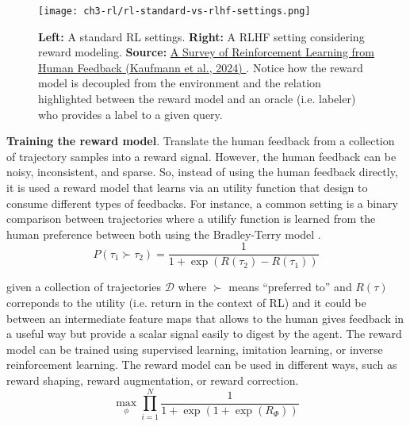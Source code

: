 \begin{figure}[ht]
    \centering
    \texttt{[image: ch3-rl/rl-standard-vs-rlhf-settings.png]}
    \captionsetup{width=\textwidth} %
    \caption{\textbf{Left:} A standard RL settings. \textbf{Right:} A RLHF setting considering reward modeling. \textbf{Source:} \href{https://arxiv.org/abs/2312.14925}{A Survey of Reinforcement Learning from Human Feedback (Kaufmann et al., 2024) \cite{kaufmann2023survey}}. Notice how the reward model is decoupled from the environment and the relation highlighted between the reward model and an oracle (i.e. labeler) who provides a label to a given query.}
    \label{fig:rlhf-setting}
  \end{figure}

\noindent \textbf{Training the reward model}. Translate the human feedback 
from a collection of trajectory samples into a reward signal. However,
the human feedback can be noisy, inconsistent, and sparse. So, instead of
using the human feedback directly, it is used a reward model that learns
via an utility function that design to consume different types of feedbacks. For instance, a common setting is a binary comparison between trajectories where a utilify function is learned from the human preference between both using the Bradley-Terry model \cite{bradley-terry-model}. \\

\begin{equation*}
P(\tau_{1}\succ\tau_{2}) = \frac{1}{1 + \exp(R(\tau_{2}) - R(\tau_{1}))}
\end{equation*}

\noindent given a collection of trajectories $\mathcal{D}$ where $\succ$ means ``preferred to'' and $R(\tau)$ correponds to the utility (i.e. return in the context of RL) and it could be between an intermediate feature maps that allows to the human gives feedback in a useful way but provide a scalar signal easily to digest by the agent. The reward model can be trained using supervised learning, imitation learning, or inverse reinforcement learning. The reward model can be used in different ways, such as reward shaping, reward augmentation, or reward correction. \\

\begin{equation}
    \underset{\phi}{\max} \prod_{i=1}^{N}\frac{1}{1 + \exp\left(1 + \exp(R_{\Phi}) \right)}
\end{equation}


